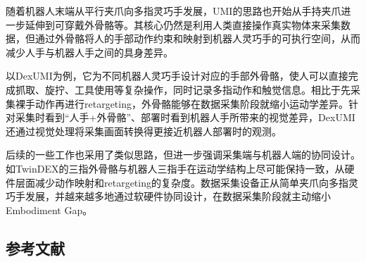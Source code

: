 随着机器人末端从平行夹爪向多指灵巧手发展，UMI的思路也开始从手持夹爪进一步延伸到可穿戴外骨骼等。其核心仍然是利用人类直接操作真实物体来采集数据，但通过外骨骼将人的手部动作约束和映射到机器人灵巧手的可执行空间，从而减少人手与机器人手之间的具身差异。

以DexUMI为例，它为不同机器人灵巧手设计对应的手部外骨骼，使人可以直接完成抓取、旋拧、工具使用等复杂操作，同时记录多指动作和触觉信息。相比于先采集裸手动作再进行retargeting，外骨骼能够在数据采集阶段就缩小运动学差异。针对采集时看到``人手+外骨骼''、部署时看到机器人手所带来的视觉差异，DexUMI还通过视觉处理将采集画面转换得更接近机器人部署时的观测。

后续的一些工作也采用了类似思路，但进一步强调采集端与机器人端的协同设计。如TwinDEX的三指外骨骼与机器人三指手在运动学结构上尽可能保持一致，从硬件层面减少动作映射和retargeting的复杂度。数据采集设备正从简单夹爪向多指灵巧手发展，并越来越多地通过软硬件协同设计，在数据采集阶段就主动缩小Embodiment Gap。

\hypertarget{ux53c2ux8003ux6587ux732e-163}{%
\subsection{参考文献}\label{ux53c2ux8003ux6587ux732e-163}}

